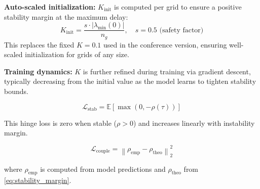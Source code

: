 \textbf{Auto-scaled initialization:} $K_{\text{init}}$ is computed per grid to ensure a positive stability margin at the maximum delay:
\begin{equation}
\label{eq:k_init_auto}
K_{\text{init}} = \frac{s \cdot |\lambda_{\min}(0)|}{n_g}, \quad s = 0.5 \text{ (safety factor)}
\end{equation}
This replaces the fixed $K=0.1$ used in the conference version, ensuring well-scaled initialization for grids of any size.

\textbf{Training dynamics:} $K$ is further refined during training via gradient descent, typically decreasing from the initial value as the model learns to tighten stability bounds.




\begin{equation}
\label{eq:stability_loss}
\mathcal{L}_{\text{stab}} = \mathbb{E}\left[ \max(0, -\rho(\tau)) \right]
\end{equation}

\noindent This hinge loss is zero when stable ($\rho > 0$) and increases linearly with instability margin.


\begin{equation}
\label{eq:coupling_loss}
\mathcal{L}_{\text{couple}} = \left\| \rho_{\text{emp}} - \rho_{\text{theo}} \right\|_2^2
\end{equation}

\noindent where $\rho_{\text{emp}}$ is computed from model predictions and $\rho_{\text{theo}}$ from \eqref{eq:stability_margin}.


